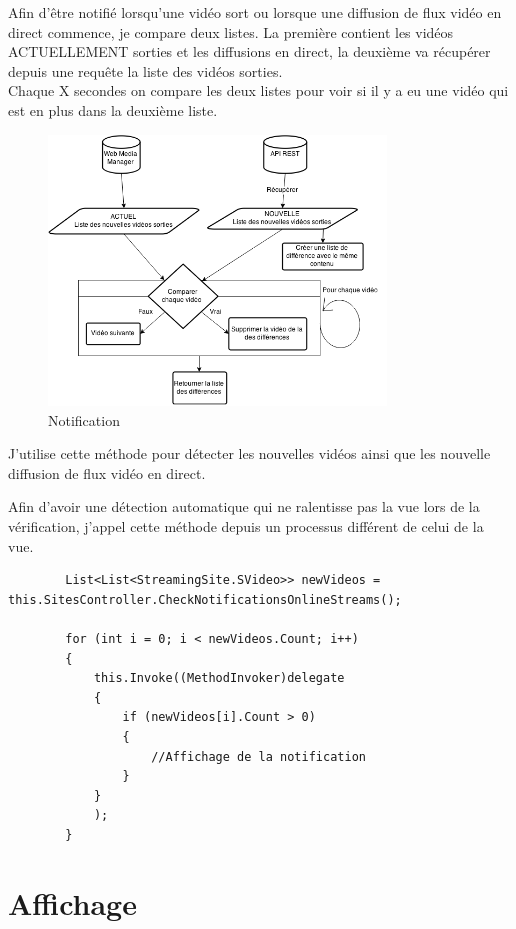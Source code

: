 \documentclass[11pt]{report} %
\begin{document}
	Afin d'être notifié lorsqu'une vidéo sort ou lorsque une diffusion de flux vidéo en direct commence, je compare deux listes. La première contient les vidéos ACTUELLEMENT sorties et les diffusions en direct, la deuxième va récupérer depuis une requête la liste des vidéos sorties. \\
	Chaque X secondes on compare les deux listes pour voir si il y a eu une vidéo qui est en plus dans la deuxième liste.
	
	\begin{figure}[h]
		\center
		\includegraphics[width=0.8\textwidth]{../img/notification.png}
		\caption{Notification}
		\label{checkNotif}
	\end{figure}
	
	J'utilise cette méthode pour détecter les nouvelles vidéos ainsi que les nouvelle diffusion de flux vidéo en direct.
	
	Afin d'avoir une détection automatique qui ne ralentisse pas la vue lors de la vérification, j'appel cette méthode depuis un processus différent de celui de la vue.
	
	\begin{lstlisting}
		List<List<StreamingSite.SVideo>> newVideos = this.SitesController.CheckNotificationsOnlineStreams();
		
		for (int i = 0; i < newVideos.Count; i++)
		{
			this.Invoke((MethodInvoker)delegate
			{
				if (newVideos[i].Count > 0)
				{
					//Affichage de la notification
				}	
			}
			);
		}
	\end{lstlisting}
	
	\newpage
	\section{Affichage}	
\end{document}
